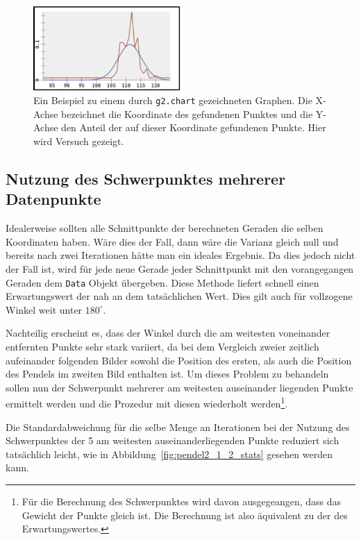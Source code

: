 \begin{figure}
    \centering
    \includegraphics[width=0.5\textwidth]{gfx/normalverteilung.png}
    \caption[Beispiel für in etwa normal verteilte Daten.]{Ein Beispiel zu einem durch \lstinline{g2.chart} gezeichneten Graphen. Die X-Achse bezeichnet die Koordinate des gefundenen Punktes und die Y-Achse den Anteil der auf dieser Koordinate gefundenen Punkte. Hier wird Versuch  gezeigt.}
    \label{fig:normalverteilung}
\end{figure}

\subsection{Nutzung des Schwerpunktes mehrerer Datenpunkte}\label{ch:nutzung_des_schwerpunktes}

Idealerweise sollten alle Schnittpunkte der berechneten Geraden die selben Koordinaten haben.
Wäre dies der Fall, dann wäre die Varianz gleich null und bereits nach zwei Iterationen hätte man ein ideales Ergebnis.
Da dies jedoch nicht der Fall ist, wird für jede neue Gerade jeder Schnittpunkt mit den vorangegangen Geraden dem \lstinline{Data} Objekt übergeben.
Diese Methode liefert schnell einen Erwartungswert der nah an dem tatsächlichen Wert.
Dies gilt auch für vollzogene Winkel weit unter $180^\circ$.

Nachteilig erscheint es, dass der Winkel durch die am weitesten voneinander entfernten Punkte sehr stark variiert, da bei dem Vergleich zweier zeitlich aufeinander folgenden Bilder sowohl die Position des ersten, als auch die Position des Pendels im zweiten Bild enthalten ist.
Um dieses Problem zu behandeln sollen nun der Schwerpunkt mehrerer am weitesten auseinander liegenden Punkte ermittelt werden und die Prozedur mit diesen wiederholt werden\footnote{Für die Berechnung des Schwerpunktes wird davon ausgegeangen, dass das Gewicht der Punkte gleich ist. Die Berechnung ist also äquivalent zu der des Erwartungswertes.}.

Die Standardabweichung für die selbe Menge an Iterationen bei der Nutzung des Schwerpunktes der 5 am weitesten auseinanderliegenden Punkte reduziert sich tatsächlich leicht, wie in Abbildung~\ref{fig:pendel2_1_2_stats} gesehen werden kann.

